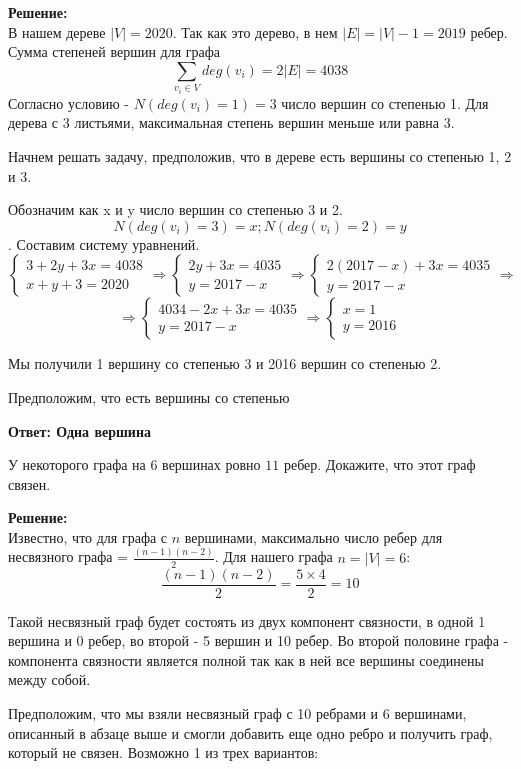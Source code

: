 \documentclass[a4paper,12pt]{article}
\newcounter{z}
\newcommand{\z}{\refstepcounter{z}\vskip 20pt\noindent
\fbox{\textbf{\arabic{z}}} }
\begin{document}
\textbf{Решение:} \\
В нашем дереве $|V| = 2020$. Так как это дерево, в нем $|E| = |V|-1 =2019$ ребер. Сумма степеней вершин для графа $$\sum_{v_i \in V}{deg(v_i)} = 2|E| = 4038$$
Согласно условию - $N(deg(v_i) =1)=3$ число вершин со степенью 1. 
Для дерева с 3 листьями, максимальная степень вершин меньше или равна 3.

Начнем решать задачу, предположив, что в дереве есть вершины со степенью 1, 2 и 3.

Обозначим как x и y число вершин со степенью 3 и 2.
$$N(deg(v_i) =3)=x; N(deg(v_i) =2)=y$$.
Составим систему уравнений.
$$\begin{cases} 3+2y + 3x = 4038 \\ x+y+3 = 2020\end{cases} \Rightarrow \begin{cases} 2y + 3x = 4035 \\ y = 2017-x\end{cases}\Rightarrow  \begin{cases} 2(2017-x) + 3x = 4035 \\ y = 2017-x\end{cases}\Rightarrow $$
$$
\Rightarrow  \begin{cases} 4034-2x + 3x = 4035 \\ y = 2017-x\end{cases}\Rightarrow  \begin{cases} x = 1 \\ y = 2016\end{cases}
$$

Мы получили 1 вершину со степенью 3 и 2016 вершин со степенью 2.

Предположим, что есть вершины со степенью 

\textbf{Ответ: Одна вершина}

\z У некоторого графа на $6$ вершинах ровно $11$ ребер. Докажите, что этот граф связен.

\textbf{Решение:} \\
Известно, что для графа с $n$ вершинами, максимально число ребер для несвязного графа = $\frac{(n-1)(n-2)}{2}$. Для нашего графа $n=|V| = 6$:
$$\frac{(n-1)(n-2)}{2}=\frac{5\times4}{2}=10$$

Такой несвязный граф будет состоять из двух компонент связности, в одной 1 вершина и 0 ребер, во второй - 5 вершин и 10 ребер. Во второй половине графа - компонента связности является полной так как в ней все вершины соединены между собой.

Предположим, что мы взяли несвязный граф с 10 ребрами и 6 вершинами, описанный в абзаце выше и смогли добавить еще одно ребро и получить граф, который не связен. Возможно 1 из трех вариантов:
\end{document}
